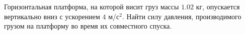 Горизонтальная платформа, на которой висит груз массы $1.02$ кг,
опускается вертикально вниз с ускорением $4$ м/с$^2$. Найти силу
давления, производимого грузом на платформу во время их совместного
спуска.
